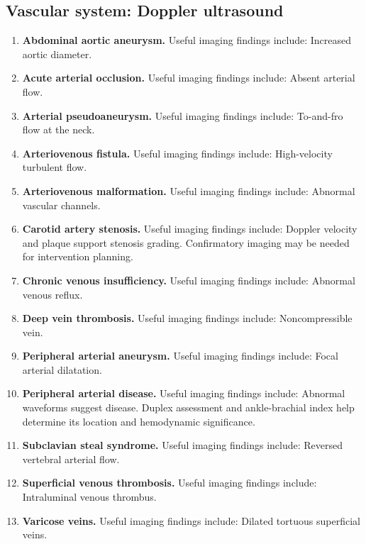 \subsection{Vascular system: Doppler ultrasound}
\begin{enumerate}[leftmargin=*,itemsep=0.45em,topsep=0.4em]
\item \textbf{Abdominal aortic aneurysm.} Useful imaging findings include: Increased aortic diameter.
\item \textbf{Acute arterial occlusion.} Useful imaging findings include: Absent arterial flow.
\item \textbf{Arterial pseudoaneurysm.} Useful imaging findings include: To-and-fro flow at the neck.
\item \textbf{Arteriovenous fistula.} Useful imaging findings include: High-velocity turbulent flow.
\item \textbf{Arteriovenous malformation.} Useful imaging findings include: Abnormal vascular channels.
\item \textbf{Carotid artery stenosis.} Useful imaging findings include: Doppler velocity and plaque support stenosis grading. Confirmatory imaging may be needed for intervention planning.
\item \textbf{Chronic venous insufficiency.} Useful imaging findings include: Abnormal venous reflux.
\item \textbf{Deep vein thrombosis.} Useful imaging findings include: Noncompressible vein.
\item \textbf{Peripheral arterial aneurysm.} Useful imaging findings include: Focal arterial dilatation.
\item \textbf{Peripheral arterial disease.} Useful imaging findings include: Abnormal waveforms suggest disease. Duplex assessment and ankle-brachial index help determine its location and hemodynamic significance.
\item \textbf{Subclavian steal syndrome.} Useful imaging findings include: Reversed vertebral arterial flow.
\item \textbf{Superficial venous thrombosis.} Useful imaging findings include: Intraluminal venous thrombus.
\item \textbf{Varicose veins.} Useful imaging findings include: Dilated tortuous superficial veins.
\end{enumerate}


